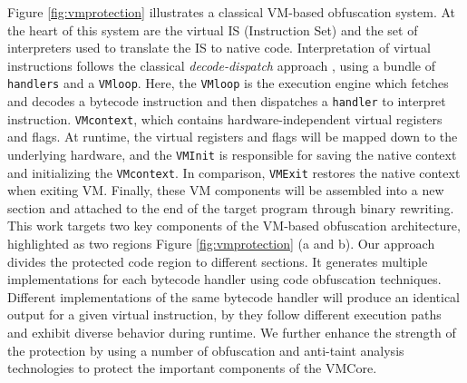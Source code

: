 Figure \ref{fig:vmprotection} illustrates a classical VM-based obfuscation system.
At the heart of this system are the virtual IS (Instruction Set) and the set of interpreters used
to translate the IS to native code.
Interpretation of virtual instructions follows the classical \textit{decode-dispatch} approach \cite{ghosh2012replacement},
using a bundle of \texttt{handlers} and a \texttt{VMloop}.
Here, the \texttt{VMloop} is the execution engine which fetches and decodes a bytecode instruction 
and then dispatches a \texttt{handler} to interpret instruction.
\texttt{VMcontext}, which contains hardware-independent virtual registers and flags.
At runtime, the virtual registers and flags will be mapped down to the underlying hardware, 
and the \texttt{VMInit} is responsible for saving the native context and initializing the \texttt{VMcontext}. 
In comparison, \texttt{VMExit} restores the native context when exiting VM.
Finally, these VM components will be assembled into a new section and attached to 
the end of the target program through binary rewriting.
This work targets two key components of the VM-based obfuscation architecture, 
highlighted as two regions Figure \ref{fig:vmprotection} (a and b).
Our approach divides the protected code region to different sections. 
It generates multiple implementations for each bytecode handler using code obfuscation techniques. 
Different implementations of the same bytecode handler will produce an identical output for a given virtual instruction, 
by they follow different execution paths and exhibit diverse behavior during runtime. 
We further enhance the strength of the protection by using a number of obfuscation 
and anti-taint analysis technologies to protect the important components of the VMCore.



